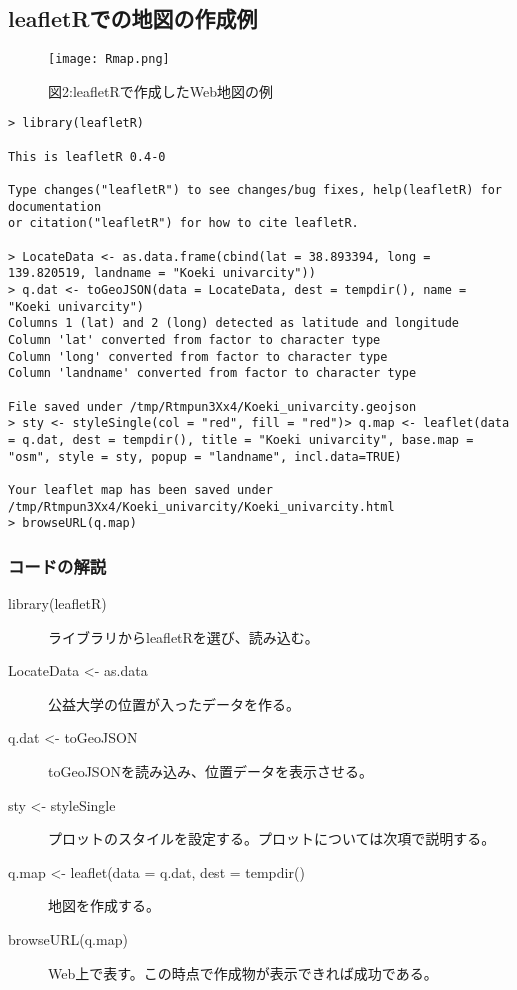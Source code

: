\documentclass[report]{jsbook}
\begin{document}
\subsection{leafletRでの地図の作成例}
\begin{center}
   \begin{figure}[htp]
    \texttt{[image: Rmap.png]}
    \caption{図2:leafletRで作成したWeb地図の例}
   \end{figure}
\end{center}
\begin{lstlisting}[caption=ソースコード1,label=R言語を用いたleafletを表示するためのコード]
  > library(leafletR)
 
This is leafletR 0.4-0
 
Type changes("leafletR") to see changes/bug fixes, help(leafletR) for documentation
or citation("leafletR") for how to cite leafletR.

> LocateData <- as.data.frame(cbind(lat = 38.893394, long = 139.820519, landname = "Koeki univarcity"))
> q.dat <- toGeoJSON(data = LocateData, dest = tempdir(), name = "Koeki univarcity")
Columns 1 (lat) and 2 (long) detected as latitude and longitude
Column 'lat' converted from factor to character type
Column 'long' converted from factor to character type
Column 'landname' converted from factor to character type

File saved under /tmp/Rtmpun3Xx4/Koeki_univarcity.geojson
> sty <- styleSingle(col = "red", fill = "red")> q.map <- leaflet(data = q.dat, dest = tempdir(), title = "Koeki univarcity", base.map = "osm", style = sty, popup = "landname", incl.data=TRUE)

Your leaflet map has been saved under /tmp/Rtmpun3Xx4/Koeki_univarcity/Koeki_univarcity.html
> browseURL(q.map)
\end{lstlisting}
\subsubsection{コードの解説}
\begin{description}
\item[library(leafletR)]ライブラリからleafletRを選び、読み込む。
\item[LocateData <- as.data]公益大学の位置が入ったデータを作る。
\item[q.dat <- toGeoJSON]toGeoJSONを読み込み、位置データを表示させる。
\item[sty <- styleSingle]プロットのスタイルを設定する。プロットについては次項で説明する。
\item[q.map <- leaflet(data = q.dat, dest = tempdir()]地図を作成する。
\item[browseURL(q.map)]Web上で表す。この時点で作成物が表示できれば成功である。
  \end{description}
\end{document}
